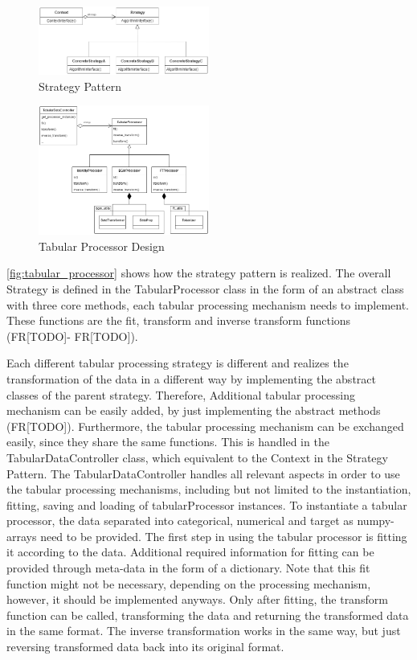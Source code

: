 \begin{figure}[h]
	\centering
	\includegraphics[width=0.5\textwidth]{images/strategy.png}
	\caption{Strategy Pattern \cite[p. 316]{gamma1994design}}
	\label{fig:design}
\end{figure}

\begin{figure}[h]
	\centering
	\includegraphics[width=0.5\textwidth]{images/tabular_processor.png}
	\caption{Tabular Processor Design}
	\label{fig:tabular_processor}
\end{figure}

\autoref{fig:tabular_processor} shows how the strategy pattern is realized.
The overall Strategy is defined in the TabularProcessor class in the form of an abstract class with three core methods, each tabular processing mechanism needs to implement.
These functions are the fit, transform and inverse transform functions (FR[TODO]- FR[TODO]).

Each different tabular processing strategy is different and realizes the transformation of the data in a different way by implementing the abstract classes of the parent strategy.
Therefore, Additional tabular processing mechanism can be easily added, by just implementing the abstract methods (FR[TODO]).
Furthermore, the tabular processing mechanism can be exchanged easily, since they share the same functions.
This is handled in the TabularDataController class, which equivalent to the Context in the Strategy Pattern.
The TabularDataController handles all relevant aspects in order to use the tabular processing mechanisms, including but not limited to the instantiation, fitting, saving and loading of tabularProcessor instances.
To instantiate a tabular processor, the data separated into categorical, numerical and target as numpy-arrays \cite{harris2020array} need to be provided.
The first step in using the tabular processor is fitting it according to the data.
Additional required information for fitting can be provided through meta-data in the form of a dictionary.
Note that this fit function might not be necessary, depending on the processing mechanism, however, it should be implemented anyways.
Only after fitting, the transform function can be called, transforming the data and returning the transformed data in the same format.
The inverse transformation works in the same way, but just reversing transformed data back into its original format.


